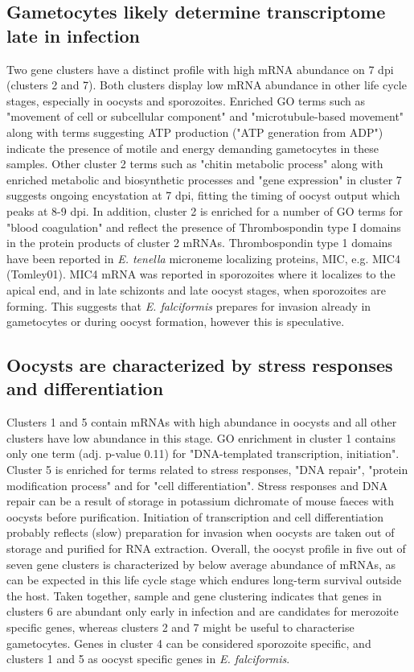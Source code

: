 \documentclass{bmcart}
\begin{document}
\subsection*{Gametocytes likely determine transcriptome late in infection}
Two gene clusters have a distinct profile with high mRNA abundance on 7 dpi (clusters 2 and 7). Both clusters display low mRNA abundance in other life cycle stages, especially in oocysts and sporozoites. Enriched GO terms such as "movement of cell or subcellular component" and "microtubule-based movement" along with terms suggesting ATP production ("ATP generation from ADP") indicate the presence of motile and energy demanding gametocytes in these samples. Other cluster 2 terms such as "chitin metabolic process" along with enriched metabolic and biosynthetic processes and "gene expression" in cluster 7 suggests ongoing encystation at 7 dpi, fitting the timing of oocyst output which peaks at 8-9 dpi. In addition, cluster 2 is enriched for a number of GO terms for "blood coagulation" and reflect 
the presence of Thrombospondin type I domains in the protein products of cluster 2 mRNAs. Thrombospondin type 1 domains have been reported in \textit{E. tenella} microneme localizing proteins, MIC, e.g. MIC4 (Tomley01). MIC4 mRNA was reported in sporozoites where it localizes to the apical end, and in late schizonts and late oocyst stages, when sporozoites are forming. This suggests that \textit{E. falciformis} prepares for invasion already in gametocytes or during oocyst formation, however this is speculative.

\subsection*{Oocysts are characterized by stress responses and differentiation}
Clusters 1 and 5 contain mRNAs with high abundance in oocysts and all other clusters have low abundance in this stage. GO enrichment in cluster 1 contains only one term (adj. p-value 0.11) for "DNA-templated transcription, initiation". Cluster 5 is enriched for terms related to stress responses, "DNA repair", "protein modification process" and for "cell differentiation". Stress responses and DNA repair can be a result of storage in potassium dichromate of mouse faeces with oocysts before purification. Initiation of transcription and cell differentiation probably reflects (slow) preparation for invasion when oocysts are taken out of storage and purified for RNA extraction. Overall, the oocyst profile in five out of seven gene clusters is characterized by below average abundance of mRNAs, as can be expected in this life cycle stage which endures long-term survival outside the host. Taken together, sample and gene clustering indicates that genes in clusters 6 are abundant only early in infection and are candidates for merozoite specific genes, whereas clusters 2 and 7 might be useful to characterise gametocytes. Genes in cluster 4 can be considered sporozoite specific, and clusters 1 and 5 as oocyst specific genes in \textit{E. falciformis}.
\end{document}
